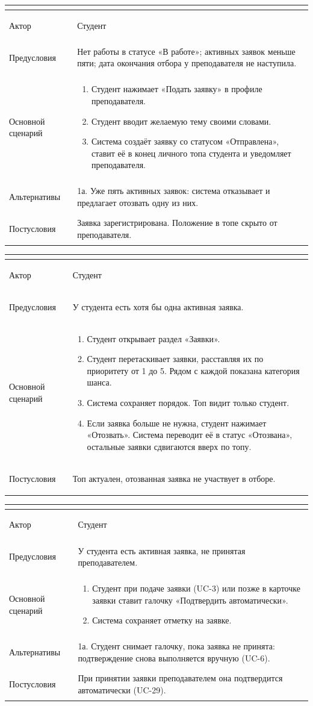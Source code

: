 \documentclass[a4paper,12pt]{article}
\newenvironment{ucd}[3]{%
  \needspace{10\baselineskip}
  \begin{longtable}{|>{\bfseries\raggedright\arraybackslash}p{3.0cm}|p{11.8cm}|}
  \hline
  \multicolumn{2}{|l|}{\textbf{#1.\ #2}}\\ \hline
  Актор & #3\\ \hline
}{\end{longtable}}
\newcommand{\steps}[1]{\begin{enumerate}[nosep,leftmargin=*]#1\end{enumerate}}
\begin{document}
\begin{ucd}{UC-3}{Подать заявку преподавателю и сформулировать свою тему}{Студент}
Предусловия & Нет работы в статусе «В работе»; активных заявок меньше пяти; дата окончания отбора у преподавателя не наступила.\\ \hline
Основной сценарий & \steps{
 \item Студент нажимает «Подать заявку» в профиле преподавателя.
 \item Студент вводит желаемую тему своими словами.
 \item Система создаёт заявку со статусом «Отправлена», ставит её в конец личного топа студента и уведомляет преподавателя.}\\ \hline
Альтернативы & 1а. Уже пять активных заявок: система отказывает и предлагает отозвать одну из них.\\ \hline
Постусловия & Заявка зарегистрирована. Положение в топе скрыто от преподавателя.\\ \hline
\end{ucd}

\begin{ucd}{UC-4}{Расставить заявки в личном топе и отозвать ненужную}{Студент}
Предусловия & У студента есть хотя бы одна активная заявка.\\ \hline
Основной сценарий & \steps{
 \item Студент открывает раздел «Заявки».
 \item Студент перетаскивает заявки, расставляя их по приоритету от 1 до 5. Рядом с каждой показана категория шанса.
 \item Система сохраняет порядок. Топ видит только студент.
 \item Если заявка больше не нужна, студент нажимает «Отозвать». Система переводит её в статус «Отозвана», остальные заявки сдвигаются вверх по топу.}\\ \hline
Постусловия & Топ актуален, отозванная заявка не участвует в отборе.\\ \hline
\end{ucd}

\begin{ucd}{UC-51}{Поставить галочку автоподтверждения}{Студент}
Предусловия & У студента есть активная заявка, не принятая преподавателем.\\ \hline
Основной сценарий & \steps{
 \item Студент при подаче заявки (UC-3) или позже в карточке заявки ставит галочку «Подтвердить автоматически».
 \item Система сохраняет отметку на заявке.}\\ \hline
Альтернативы & 1а. Студент снимает галочку, пока заявка не принята: подтверждение снова выполняется вручную (UC-6).\\ \hline
Постусловия & При принятии заявки преподавателем она подтвердится автоматически (UC-29).\\ \hline
\end{ucd}
\end{document}
